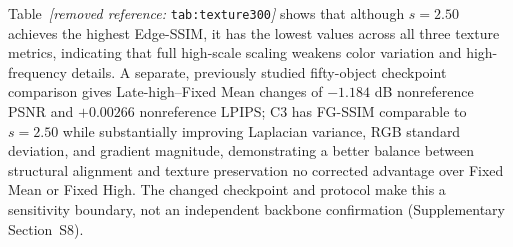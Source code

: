 \documentclass[times,twocolumn,final]{elsarticle}
\providecommand{\DIFadd}[1]{{\protect\color{blue} \sf #1}} %
\providecommand{\DIFdel}[1]{{\protect\color{red} \scriptsize #1}} %
\providecommand{\DIFaddbegin}{} %
\providecommand{\DIFaddend}{} %
\providecommand{\DIFdelbegin}{} %
\providecommand{\DIFdelend}{} %
\begin{document}
\DIFdelbegin %

\DIFdel{Table~\textit{[removed reference: }\texttt{tab:texture300}\textit{]} shows that although $s = 2.50$ achieves the highest Edge-SSIM, it has the lowest values across all three texture metrics, indicating that full high-scale scaling weakens color variation and high-frequency details. }\DIFdelend \DIFaddbegin \DIFadd{A separate, previously studied fifty-object checkpoint comparison gives Late-high--Fixed Mean changes of $-1.184$ dB nonreference PSNR and $+0.00266$ nonreference LPIPS; }\DIFaddend C3 has \DIFdelbegin \DIFdel{FG-SSIM comparable to $s = 2.50$ while substantially improving Laplacian variance, RGB standard deviation, and gradient magnitude, demonstrating a better balance between structural alignment and texture preservation}\DIFdelend \DIFaddbegin \DIFadd{no corrected advantage over Fixed Mean or Fixed High. The changed checkpoint and protocol make this a sensitivity boundary, not an independent backbone confirmation (Supplementary Section~S8)}\DIFaddend .
\end{document}
